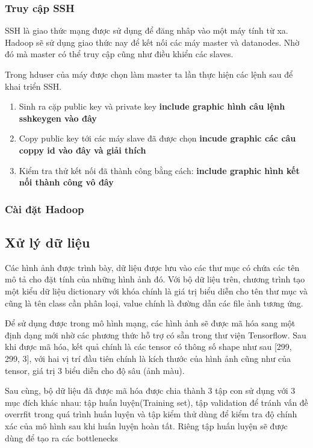 		\subsubsection{Truy cập SSH}
		SSH là giao thức mạng được sử dụng để đăng nhâp vào một máy tính từ xa. Hadoop sẽ sử dụng giao thức nay để kết nối các máy master và datanodes. Nhờ đó mà master có thể truy cập cũng như điều khiển các slaves.\par 
		Trong hduser của máy được chọn làm master ta lần thực hiện các lệnh sau để khai triển SSH.
		\begin{enumerate}
			\item Sinh ra cặp public key và private key
			\textbf{include graphic hình câu lệnh sshkeygen vào đây}
			\item Copy public key tới các máy slave đã được chọn
			\textbf{incude graphic các câu coppy id vào đây và giải thích}
			\item Kiểm tra thử kết nối đã thành công bằng cách:
			\textbf{include graphic hình kết nối thành công vô đây}
		\end{enumerate}
		
		\subsubsection{Cài đặt Hadoop}
			
			
		
				

	\subsection{Xử lý dữ liệu}
	
		Các hình ảnh được trình bày, dữ liệu được lưu vào các thư mục có chứa các tên mô tả cho đặt tính của những hình ảnh đó. Với bộ dữ liệu trên, chương trình tạo một kiểu dữ liệu dictionary với khóa chính là giá trị biểu diễn cho tên thư mục và cũng là tên class cần phân loại, value chính là đường dẫn các file ảnh tương ứng.\par
		 Để sử dụng được trong mô hình mạng, các hình ảnh sẽ được mã hóa sang một định dạng mới nhờ các phương thức hỗ trợ có sẵn trong thư viện Tensorflow. Sau khi được mã hóa, kết quả chính là các tensor có thông số shape như sau [299, 299, 3], với hai vị trí đầu tiên chính là kích thước của hình ảnh cũng như của tensor, giá trị 3 biểu diễn cho độ sâu (ảnh màu).\par
	 	Sau cùng, bộ dữ liệu đã được mã hóa được chia thành 3 tập con sử dụng với 3 mục đích khác nhau: tập huấn luyện(Training set), tập validation để tránh vấn đề overrfit trong quá trình huấn luyện và tập kiểm thử dùng để kiểm tra độ chính xác của mô hình sau khi huấn luyện hoàn tất.	Riêng tập huấn luyện sẽ được dùng để tạo ra các bottlenecks
	
